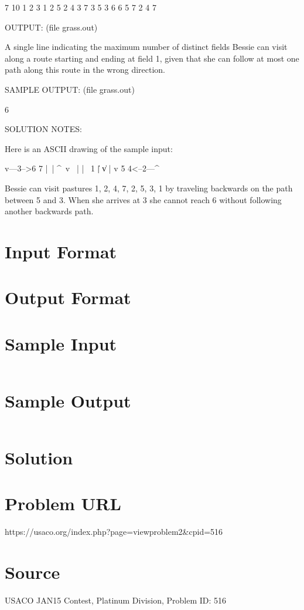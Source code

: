 \documentclass[12pt]{article}
\begin{document}
7 10
1 2
3 1
2 5
2 4
3 7
3 5
3 6
6 5
7 2
4 7

OUTPUT: (file grass.out)

A single line indicating the maximum number of distinct fields Bessie
can visit along a route starting and ending at field 1, given that she can
follow at most one path along this route in the wrong direction.

SAMPLE OUTPUT: (file grass.out)

6

SOLUTION NOTES:

Here is an ASCII drawing of the sample input:

v---3-->6
7   |\  |
^\  v \ |
| \ 1  \|
|  \|   v
|   v   5
4<--2---^

Bessie can visit pastures 1, 2, 4, 7, 2, 5, 3, 1 by traveling
backwards on the path between 5 and 3.  When she arrives at 3 she
cannot reach 6 without following another backwards path.



\section*{Input Format}


\section*{Output Format}


\section*{Sample Input}
\begin{verbatim}

\end{verbatim}

\section*{Sample Output}
\begin{verbatim}

\end{verbatim}

\section*{Solution}


\section*{Problem URL}
https://usaco.org/index.php?page=viewproblem2&cpid=516

\section*{Source}
USACO JAN15 Contest, Platinum Division, Problem ID: 516
\end{document}
